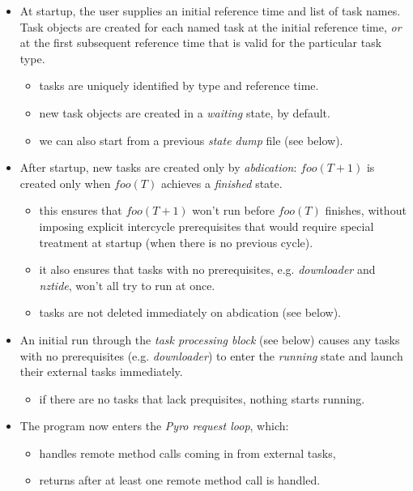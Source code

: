 \documentclass[12pt]{amsart}
\begin{document}
\begin{itemize}
    \item At startup, the user supplies an initial reference time and
    list of task names. Task objects are created for each named task at
    the initial reference time, {\em or} at the first subsequent
    reference time that is valid for the particular task type.
    \begin{itemize}
        \item tasks are uniquely identified by type and reference time. 
        \item new task objects are created in a {\em waiting} state, by
        default.
        \item we can also start from a previous {\em state dump} file
        (see below).
    \end{itemize}

\item After startup, new tasks are created only by {\em abdication}:
$foo(T+1)$ is created only when $foo(T)$ achieves a {\em finished} state.
    \begin{itemize}
    \item this ensures that $foo(T+1)$ won't run before $foo(T)$
    finishes, without imposing explicit intercycle prerequisites
    that would require special treatment at startup (when there is no
    previous cycle). 
    \item it also ensures that tasks with no prerequisites, e.g.
    {\em downloader} and {\em nztide}, won't all try to run at once.
    \item tasks are not deleted immediately on abdication (see below). 
    \end{itemize}

\item An initial run through the {\em task processing block} (see below)
causes any tasks with no prerequisites (e.g. {\em downloader}) to enter the
{\em running} state and launch their external tasks immediately.
    \begin{itemize}
    \item if there are no tasks that lack prequisites, nothing starts running.
    \end{itemize}

\item The program now enters the {\em Pyro request loop}, which:

    \begin{itemize}
    \item handles remote method calls coming in from external tasks, 
    \item returns after at least one remote method call is handled. 
    \end{itemize}


\end{itemize}
\end{document}
